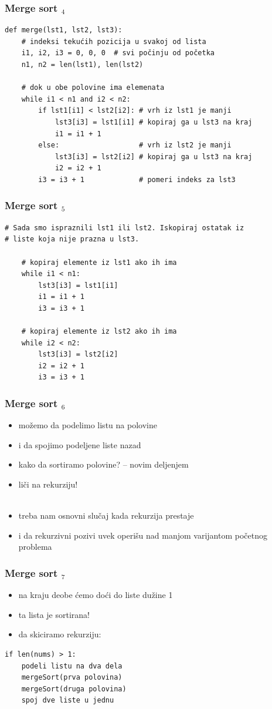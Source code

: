 \documentclass[utf8,compress,aspectratio=169]{beamer}
\begin{document}
\begin{frame}[fragile]
  \frametitle{Merge sort $_4$}
\begin{verbatim}
def merge(lst1, lst2, lst3):
    # indeksi tekućih pozicija u svakoj od lista
    i1, i2, i3 = 0, 0, 0  # svi počinju od početka
    n1, n2 = len(lst1), len(lst2)

    # dok u obe polovine ima elemenata
    while i1 < n1 and i2 < n2:
        if lst1[i1] < lst2[i2]: # vrh iz lst1 je manji
            lst3[i3] = lst1[i1] # kopiraj ga u lst3 na kraj
            i1 = i1 + 1
        else:                   # vrh iz lst2 je manji
            lst3[i3] = lst2[i2] # kopiraj ga u lst3 na kraj
            i2 = i2 + 1
        i3 = i3 + 1             # pomeri indeks za lst3
\end{verbatim}
\end{frame}

\begin{frame}[fragile]
  \frametitle{Merge sort $_5$}
\begin{verbatim}
# Sada smo ispraznili lst1 ili lst2. Iskopiraj ostatak iz
# liste koja nije prazna u lst3.

    # kopiraj elemente iz lst1 ako ih ima
    while i1 < n1:
        lst3[i3] = lst1[i1]
        i1 = i1 + 1
        i3 = i3 + 1

    # kopiraj elemente iz lst2 ako ih ima
    while i2 < n2:
        lst3[i3] = lst2[i2]
        i2 = i2 + 1
        i3 = i3 + 1
\end{verbatim}
\end{frame}

\begin{frame}[fragile]
  \frametitle{Merge sort $_6$}
  \begin{itemize}
    \item možemo da podelimo listu na polovine
    \item i da spojimo podeljene liste nazad
    \item kako da sortiramo polovine? -- novim deljenjem
    \item liči na rekurziju! \\ \ \\
    \item treba nam osnovni slučaj kada rekurzija prestaje
    \item i da rekurzivni pozivi uvek operišu nad manjom varijantom početnog problema
  \end{itemize}
\end{frame}

\begin{frame}[fragile]
  \frametitle{Merge sort $_7$}
  \begin{itemize}
    \item na kraju deobe ćemo doći do liste dužine 1
    \item ta lista je sortirana!
    \item da skiciramo rekurziju:
  \end{itemize}
\begin{verbatim}
if len(nums) > 1:
    podeli listu na dva dela
    mergeSort(prva polovina)
    mergeSort(druga polovina)
    spoj dve liste u jednu
\end{verbatim}
\end{frame}
\end{document}
